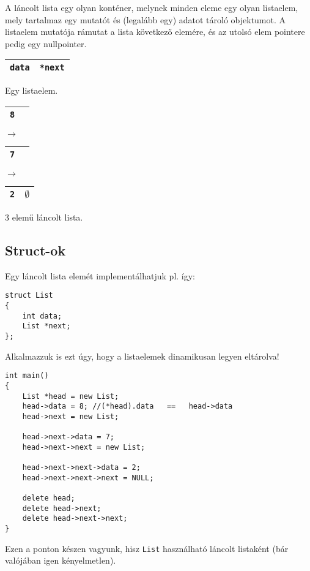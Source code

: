 \documentclass[a4paper,11.5pt,table]{article}
\begin{document}
	\smallskip
	A láncolt lista egy olyan konténer, melynek minden eleme egy olyan listaelem, mely tartalmaz egy mutatót és (legalább egy) adatot tároló objektumot. A listaelem mutatója rámutat a lista következő elemére, és az utolsó elem pointere pedig egy nullpointer.
	\begin{center}
		\begin{tabular}{|c|c|}
			\hline
			\texttt{data}&\texttt{*next}\\
			\hline
		\end{tabular}
		\smallskip
		
		Egy listaelem.
		\medskip
		
		\begin{tabular}{|c|c|}
			\hline
			\texttt{8}&\texttt{}\\
			\hline
		\end{tabular}$\rightarrow$
		\begin{tabular}{|c|c|}
			\hline
			\texttt{7}&\texttt{}\\
			\hline
		\end{tabular}$\rightarrow$
		\begin{tabular}{|c|c|}
			\hline
			\texttt{2}&\texttt{$\emptyset$}\\
			\hline
		\end{tabular}
		\smallskip
		
		3 elemű láncolt lista.
	\end{center}
	\subsection{Struct-ok}
	Egy láncolt lista elemét implementálhatjuk pl. így:
	\begin{lstlisting}
struct List
{
	int data;
	List *next;
};
	\end{lstlisting}
	Alkalmazzuk is ezt úgy, hogy  a listaelemek dinamikusan legyen eltárolva!
	\begin{lstlisting}
int main()
{
	List *head = new List;
	head->data = 8; //(*head).data   ==   head->data
	head->next = new List;
	
	head->next->data = 7;
	head->next->next = new List;
	
	head->next->next->data = 2;
	head->next->next->next = NULL;
	
	delete head;
	delete head->next;
	delete head->next->next;
}
	\end{lstlisting}
	Ezen a ponton készen vagyunk, hisz \texttt{List} használható láncolt listaként (bár valójában igen kényelmetlen).
	\medskip
	
\end{document}
